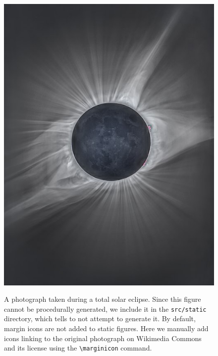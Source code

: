 \documentclass[twocolumn]{aastex631}
\begin{document}
\begin{figure}[ht!]
    \begin{centering}
        \includegraphics[width=0.75\linewidth]{static/eclipse.jpeg}
        \caption{
            A photograph taken during a total solar eclipse. 
            Since this figure cannot be procedurally generated, we include it in the \texttt{src/static} directory, which tells \showyourwork to not attempt to generate it. 
            By default, margin icons are not added to static figures.
            Here we manually add icons linking to the original photograph on Wikimedia Commons and its license using the \texttt{\textbackslash marginicon} command.
        }
        \label{fig:eclipse}
    \end{centering}
\end{figure}


\end{document}
